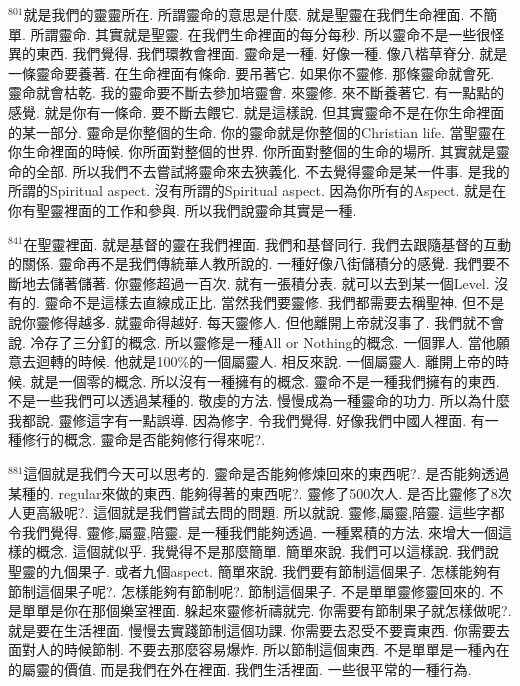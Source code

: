 \documentclass{book}
\begin{document}
$^{801}$就是我們的靈靈所在.
所謂靈命的意思是什麼.
就是聖靈在我們生命裡面.
不簡單.
所謂靈命.
其實就是聖靈.
在我們生命裡面的每分每秒.
所以靈命不是一些很怪異的東西.
我們覺得.
我們環教會裡面.
靈命是一種.
好像一種.
像八楷草脊分.
就是一條靈命要養著.
在生命裡面有條命.
要吊著它.
如果你不靈修.
那條靈命就會死.
靈命就會枯乾.
我的靈命要不斷去參加培靈會.
來靈修.
來不斷養著它.
有一點點的感覺.
就是你有一條命.
要不斷去餵它.
就是這樣說.
但其實靈命不是在你生命裡面的某一部分.
靈命是你整個的生命.
你的靈命就是你整個的Christian life.
當聖靈在你生命裡面的時候.
你所面對整個的世界.
你所面對整個的生命的場所.
其實就是靈命的全部.
所以我們不去嘗試將靈命來去狹義化.
不去覺得靈命是某一件事.
是我的所謂的Spiritual aspect.
沒有所謂的Spiritual aspect.
因為你所有的Aspect.
就是在你有聖靈裡面的工作和參與.
所以我們說靈命其實是一種.

$^{841}$在聖靈裡面.
就是基督的靈在我們裡面.
我們和基督同行.
我們去跟隨基督的互動的關係.
靈命再不是我們傳統華人教所說的.
一種好像八街儲積分的感覺.
我們要不斷地去儲著儲著.
你靈修超過一百次.
就有一張積分表.
就可以去到某一個Level.
沒有的.
靈命不是這樣去直線成正比.
當然我們要靈修.
我們都需要去稱聖神.
但不是說你靈修得越多.
就靈命得越好.
每天靈修人.
但他離開上帝就沒事了.
我們就不會說.
冷存了三分釘的概念.
所以靈修是一種All or Nothing的概念.
一個罪人.
當他願意去迴轉的時候.
他就是100\%的一個屬靈人.
相反來說.
一個屬靈人.
離開上帝的時候.
就是一個零的概念.
所以沒有一種擁有的概念.
靈命不是一種我們擁有的東西.
不是一些我們可以透過某種的.
敬虔的方法.
慢慢成為一種靈命的功力.
所以為什麼我都說.
靈修這字有一點誤導.
因為修字.
令我們覺得.
好像我們中國人裡面.
有一種修行的概念.
靈命是否能夠修行得來呢?.

$^{881}$這個就是我們今天可以思考的.
靈命是否能夠修煉回來的東西呢?.
是否能夠透過某種的.
regular來做的東西.
能夠得著的東西呢?.
靈修了500次人.
是否比靈修了8次人更高級呢?.
這個就是我們嘗試去問的問題.
所以就說.
靈修,屬靈,陪靈.
這些字都令我們覺得.
靈修,屬靈,陪靈.
是一種我們能夠透過.
一種累積的方法.
來增大一個這樣的概念.
這個就似乎.
我覺得不是那麼簡單.
簡單來說.
我們可以這樣說.
我們說聖靈的九個果子.
或者九個aspect.
簡單來說.
我們要有節制這個果子.
怎樣能夠有節制這個果子呢?.
怎樣能夠有節制呢?.
節制這個果子.
不是單單靈修靈回來的.
不是單單是你在那個樂室裡面.
躲起來靈修祈禱就完.
你需要有節制果子就怎樣做呢?.
就是要在生活裡面.
慢慢去實踐節制這個功課.
你需要去忍受不要賣東西.
你需要去面對人的時候節制.
不要去那麼容易爆炸.
所以節制這個東西.
不是單單是一種內在的屬靈的價值.
而是我們在外在裡面.
我們生活裡面.
一些很平常的一種行為.
\end{document}
